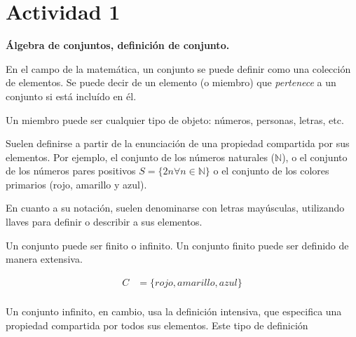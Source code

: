 \section*{Actividad 1}

\textbf{Álgebra de conjuntos, definición de conjunto. }

En el campo de la matemática, un conjunto se puede definir como 
una colección de elementos. Se puede decir de un elemento (o miembro) 
que \textit{pertenece} a un conjunto si está incluído en él. 

Un miembro puede ser cualquier tipo de objeto: números, personas, letras, etc.

Suelen definirse a partir de la enunciación de una propiedad compartida
por sus elementos. Por ejemplo, el conjunto de los números naturales 
($\mathbb{N}$), o el conjunto de los números pares positivos $S = \{2n \forall n \in \mathbb{N}\}$ o el conjunto de los colores primarios (rojo, amarillo y azul).

En cuanto a su notación, suelen denominarse con letras mayúsculas, utilizando
llaves para definir o describir a sus elementos.

Un conjunto puede ser finito o infinito. Un conjunto finito puede ser definido
de manera extensiva.

\begin{align*}
	C &= \{ rojo, amarillo, azul\}\\
\end{align*}

Un conjunto infinito, en cambio, usa la definición intensiva, que especifica
una propiedad compartida por todos sus elementos. Este tipo de definición
